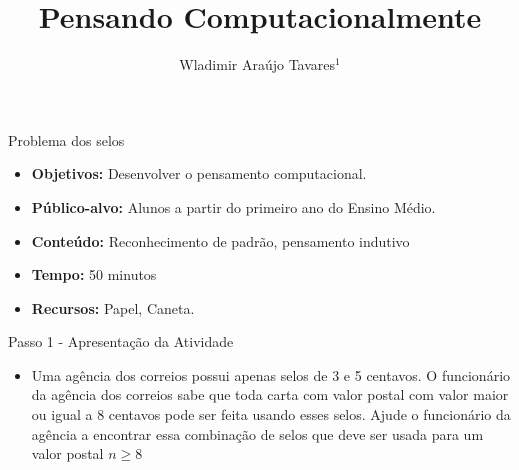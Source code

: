 \documentclass{beamer}
\title {Pensando Computacionalmente}
\author[Wladimir Araújo Tavares]{ Wladimir Araújo Tavares$^{1}$  }
\institute[UFC]{$^{1}$Universidade Federal do Ceará - Campus de Quixadá\\}
\date{}
\begin{document}
\begin{frame}
	\titlepage
\end{frame}




\begin{frame}{Problema dos selos}

\begin{itemize}
\item \textbf{Objetivos:} Desenvolver o pensamento computacional.

\item \textbf{Público-alvo:}  Alunos a partir do primeiro ano do Ensino Médio.

\item \textbf{Conteúdo:} Reconhecimento de padrão, pensamento indutivo

\item \textbf{Tempo:} 50 minutos

\item \textbf{Recursos:} Papel, Caneta.

\end{itemize}
    
\end{frame}


\begin{frame}{Passo 1 - Apresentação da Atividade}

\begin{itemize}
   
\item <1-> Uma agência dos correios possui apenas selos de 3 e 5 centavos. O funcionário da agência dos correios sabe que toda carta com valor postal com valor maior ou igual a 8 centavos pode ser feita usando esses selos. Ajude o funcionário da agência a encontrar essa combinação de selos que deve ser usada para um valor postal $n \geq 8$
\end{itemize}

\end{frame}
\end{document}
